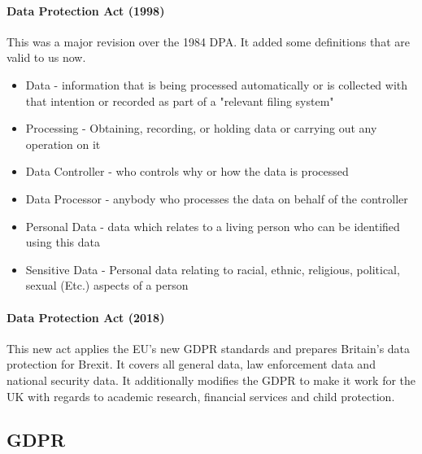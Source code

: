 \paragraph{Data Protection Act (1998)} This was a major revision over the 1984 DPA. It added some definitions that are valid to us now.
\begin{itemize}
	\item Data - information that is being processed automatically or is collected with that intention or recorded as part of a "relevant filing system"
	\item Processing - Obtaining, recording, or holding data or carrying out any operation on it
	\item Data Controller - who controls why or how the data is processed
	\item Data Processor - anybody who processes the data on behalf of the controller
	\item Personal Data - data which relates to a living person who can be identified using this data
	\item Sensitive Data - Personal data relating to racial, ethnic, religious, political, sexual (Etc.) aspects of a person
\end{itemize}
\paragraph{Data Protection Act (2018)} This new act applies the EU's new GDPR standards and prepares Britain's data protection for Brexit. It covers all general data, law enforcement data and national security data. It additionally modifies the GDPR to make it work for the UK with regards to academic research, financial services and child protection.
\subsection{GDPR}
